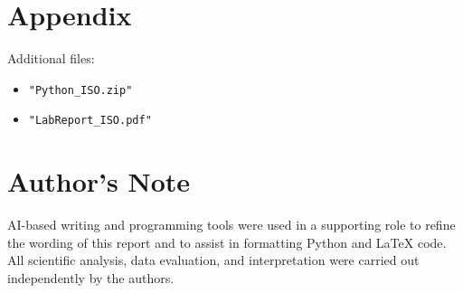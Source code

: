 \documentclass[a4paper]{article}
\begin{document}
\newpage
\section{Appendix}

Additional files:

\begin{itemize}
  \item \texttt{"Python\_ISO.zip"}
  \item \texttt{"LabReport\_ISO.pdf"}
\end{itemize}



\printbibliography[heading=bibintoc]

\section*{Author's Note}
AI-based writing and programming tools were used in a supporting role to refine the wording of this report and to assist in formatting Python and LaTeX code.
All scientific analysis, data evaluation, and interpretation were carried out independently by the authors.




\newpage

\end{document}
